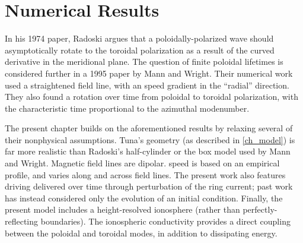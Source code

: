 


\chapter{Numerical Results}
  \label{ch_results}

In his 1974 paper, Radoski argues that a poloidally-polarized wave should asymptotically rotate to the toroidal polarization\cite{radoski_1974} as a result of the curved derivative in the meridional plane. The question of finite poloidal lifetimes is considered further in a 1995 paper by Mann and Wright\cite{mann_1995}. Their numerical work used a straightened field line, with an \Alfven speed gradient in the ``radial'' direction. They also found a rotation over time from poloidal to toroidal polarization, with the characteristic time proportional to the azimuthal modenumber. 



The present chapter builds on the aforementioned results by relaxing several of their nonphysical assumptions. Tuna's geometry (as described in \cref{ch_model}) is far more realistic than Radoski's half-cylinder or the box model used by Mann and Wright. Magnetic field lines are dipolar. \Alfven speed is based on an empirical profile, and varies along and across field lines. The present work also features driving delivered over time through perturbation of the ring current; past work has instead considered only the evolution of an initial condition. Finally, the present model includes a height-resolved ionosphere (rather than perfectly-reflecting boundaries). The ionospheric conductivity provides a direct coupling between the poloidal and toroidal modes, in addition to dissipating energy. 





